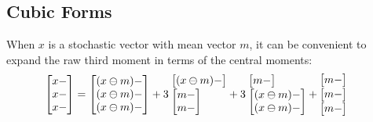 \subsection{Cubic Forms}
When $x$ is a stochastic vector with mean vector $m$,
it can be convenient to expand the raw third moment in terms of the central moments:
\renewcommand*{\arraystretch}{1}
\begin{align*}
\begin{bmatrix}
   x - \\
   x - \\
   x -
\end{bmatrix}
&=
\begin{bmatrix}
   (x\ominus m) - \\
   (x\ominus m) - \\
   (x\ominus m) -
\end{bmatrix}
\vspace{-.5em}
+
3
\hspace{-.25em}
\begin{array}{l}
\begin{bmatrix}
   (x\ominus m) -
\end{bmatrix}\\[.1em]
\begin{bmatrix}
   m - \\
   m -
\end{bmatrix}
\end{array}
\hspace{-.5em}
+
3
\hspace{-.25em}
\begin{array}{l}
\begin{bmatrix}
   m -
\end{bmatrix}\\[.1em]
\begin{bmatrix}
   (x\ominus m) - \\
   (x\ominus m) -
\end{bmatrix}
\end{array}
\hspace{-.5em}
+
\hspace{-.5em}
\begin{array}{c}
\begin{bmatrix}
   m -
\end{bmatrix}\\[.1em]
\begin{bmatrix}
   m -
\end{bmatrix}\\[.1em]
\begin{bmatrix}
   m -
\end{bmatrix}

\end{array}
\end{align*}
